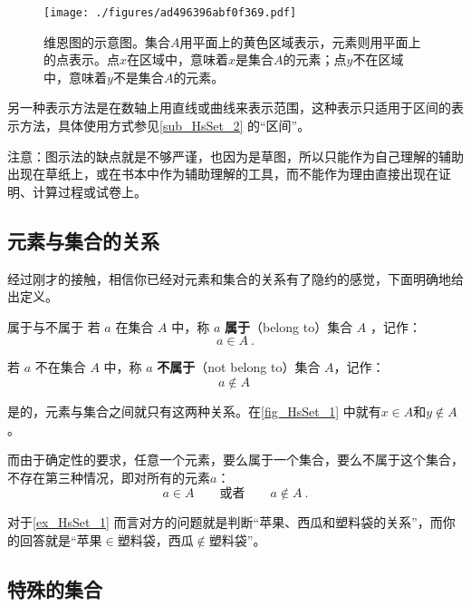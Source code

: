 \begin{figure}[ht]
\centering
\texttt{[image: ./figures/ad496396abf0f369.pdf]}
\caption{维恩图的示意图。集合$A$用平面上的黄色区域表示，元素则用平面上的点表示。点$x$在区域中，意味着$x$是集合$A$的元素；点$y$不在区域中，意味着$y$不是集合$A$的元素。} \label{fig_HsSet_1}
\end{figure}

另一种表示方法是在数轴上用直线或曲线来表示范围，这种表示只适用于区间的表示方法，具体使用方式参见\autoref{sub_HsSet_2} 的“区间”。

注意：图示法的缺点就是不够严谨，也因为是草图，所以只能作为自己理解的辅助出现在草纸上，或在书本中作为辅助理解的工具，而不能作为理由直接出现在证明、计算过程或试卷上。

\subsection{元素与集合的关系}

经过刚才的接触，相信你已经对元素和集合的关系有了隐约的感觉，下面明确地给出定义。

\begin{definition}{属于与不属于}
若 $a$ 在集合 $A$ 中，称 $a$ \textbf{属于}（belong to）集合 $A$ ，记作：
\begin{equation}
a \in A~.
\end{equation}

若 $a$ 不在集合 $A$ 中，称 $a$ \textbf{不属于}（not belong to）集合 $A$，记作：
\begin{equation}
a\notin A~
\end{equation}
\end{definition}
是的，元素与集合之间就只有这两种关系。在\autoref{fig_HsSet_1} 中就有$x\in A$和$y\not\in A$。


而由于确定性的要求，任意一个元素，要么属于一个集合，要么不属于这个集合，不存在第三种情况，即对所有的元素$a$：
\begin{equation}
a\in A\qquad\text{或者}\qquad a\not\in A~.
\end{equation}

对于\autoref{ex_HsSet_1} 而言对方的问题就是判断“苹果、西瓜和塑料袋的关系”，而你的回答就是“苹果$\in$塑料袋，西瓜$\notin$塑料袋”。

\subsection{特殊的集合}\label{sub_HsSet_2}



